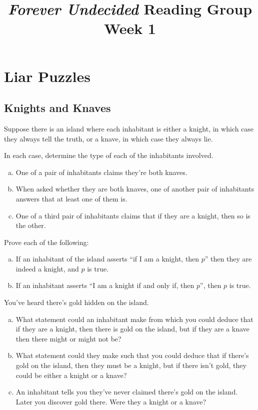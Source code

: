 \documentclass{article}
\title{\emph{Forever Undecided} Reading Group \\ Week 1}
\date{}
\author{}
\begin{document}
\maketitle

\section*{Liar Puzzles}

\subsection*{Knights and Knaves}
Suppose there is an island where each inhabitant is either a knight, in which case they always tell the truth, or a knave, in which case they always lie.

\begin{prob}{1.1}
    In each case, determine the type of each of the inhabitants involved.
    \begin{enumerate}[a)]
        \item One of a pair of inhabitants claims they're both knaves.
        \item When asked whether they are both knaves, one of another pair of inhabitants answers that at least one of them is.
        \item One of a third pair of inhabitants claims that if they are a knight, then so is the other.
    \end{enumerate}
\end{prob}

\begin{prob}{1.2}
    Prove each of the following:
    \begin{enumerate}[a)]
        \item If an inhabitant of the island asserts ``if I am a knight, then $p$'' then they are indeed a knight, and $p$ is true.
        \item If an inhabitant asserts ``I am a knight if and only if, then $p$'', then $p$ is true.
    \end{enumerate}
\end{prob}

\begin{prob}{1.3}
    You've heard there's gold hidden on the island.
    \begin{enumerate}[a)]
        \item What statement could an inhabitant make from which you could deduce that if they are a knight, then there is gold on the island, but if they are a knave then there might or might not be?
        \item What statement could they make such that you could deduce that if there's gold on the island, then they must be a knight, but if there isn't gold, they could be either a knight or a knave?
        \item An inhabitant tells you they've never claimed there's gold on the island. Later you discover gold there. Were they a knight or a knave?
    \end{enumerate}
\end{prob}
\end{document}
